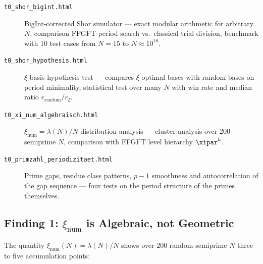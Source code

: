 \begin{description}
  \item[\texttt{t0\_shor\_bigint.html}]
    BigInt-corrected Shor simulator ---
    exact modular arithmetic for arbitrary $N$,
    comparison FFGFT period search vs.\ classical trial division,
    benchmark with 10 test cases from $N=15$ to $N \approx 10^{18}$.

  \item[\texttt{t0\_shor\_hypothesis.html}]
    $\xi$-basis hypothesis test ---
    compares $\xi$-optimal bases with random bases
    on period minimality, statistical test over many $N$
    with win rate and median ratio $r_\text{random}/r_\xi$.

  \item[\texttt{t0\_xi\_num\_algebraisch.html}]
    $\xi_\text{num} = \lambda(N)/N$ distribution analysis ---
    cluster analysis over 200 semiprime $N$,
    comparison with FFGFT level hierarchy $\xipar^k$.

  \item[\texttt{t0\_primzahl\_periodizitaet.html}]
    Prime gaps, residue class patterns, $p{-}1$ smoothness
    and autocorrelation of the gap sequence ---
    four tests on the period structure of the primes themselves.
\end{description}

\subsection{Finding 1: \texorpdfstring{$\xi_\text{num}$}{xi\_num} is Algebraic,
  not Geometric}

The quantity $\xi_\text{num}(N) = \lambda(N)/N$
shows over 200 random semiprime $N$
three to five accumulation points:

\begin{center}
{\footnotesize
{}
} %
\end{center}

